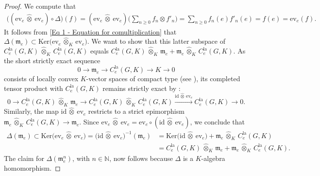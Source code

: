 \documentclass[a4paper, reqno, 10pt]{amsart}
\theoremstyle{definition}
\numberwithin{equation}{section}
\newcommand{\cotimes}[1]{{\,\widehat{\otimes}_{#1}\,}}
\newcommand{\ev}{{\mathrm{ev}}}
\newcommand{\id}{{\mathrm{id}}}
\newcommand{\Ker}{{\mathrm{Ker}}}
\newcommand{\la}{{\mathrm{la}}}
\newcommand{\lra}{\longrightarrow}
\newcommand{\lto}{\longmapsto}
\newcommand{\projotimes}{{\,\otimes_{K,\pi}\,}}
\newcommand{\projcotimes}{{\,\widehat{\otimes}_{K,\pi}\,}}
\newcommand{\ra}{\rightarrow}
\newcommand{\BN}{{\mathbb {N}}}
\newcommand{\Fm}{{\mathfrak {m}}}
\begin{document}
\begin{proof}
	We compute that
	\begin{align*}
		\big((\mathrm{ev}_e \cotimes{} \mathrm{ev}_e)\circ \Delta\big)(f) = (\mathrm{ev}_e \cotimes{} \mathrm{ev}_e)\bigg(\sum_{n\geq 0} f_n \otimes f'_n\bigg) = \sum_{n\geq 0} f_n(e) f'_n(e) = f(e) = \ev_e(f).
	\end{align*}
	It follows from \eqref{Eq 1 - Equation for comultiplication} that $\Delta(\Fm_e) \subset \Ker \big(\mathrm{ev}_e \cotimes{K} \mathrm{ev}_e \big)$.
	We want to show that this latter subspace of $C^\la_e(G,K) \cotimes{K} C^\la_e(G,K)$ equals $C^\la_e(G,K) \cotimes{K} \Fm_e + \Fm_e \cotimes{K} C^\la_e(G,K)$.
	As the short strictly exact sequence
	\begin{equation*}
		0 \lra  \Fm_e  \lra  C^\la_e(G,K) \lra K  \lra 0
	\end{equation*}	
	consists of locally convex $K$-vector spaces of compact type (see ), its completed tensor product with $C^\la_e(G,K)$ remains strictly exact by \cite[Cor.\ 2.2]{BreuilHerzig18TowardsFinSlopePartGLn}:
	\begin{equation*}
		0 \lra C^\la_e(G,K) \cotimes{K} \Fm_e  \lra  C^\la_e(G,K) \cotimes{K} C^\la_e(G,K) \xrightarrow{\id \cotimes{} \ev_e} C^\la_e(G,K)  \lra 0 .
	\end{equation*}
	Similarly, the map $\id \cotimes{} \ev_e $ restricts to a strict epimorphism $ \Fm_e \cotimes{K} C^\la_e(G,K) \ra \Fm_e$.
	Since $\mathrm{ev}_e \cotimes{} \mathrm{ev}_e = \mathrm{ev}_e \circ (\id \cotimes{} \ev_e)$, we conclude that
	\begin{align*}
		\Delta(\Fm_e) \subset \Ker\big(\mathrm{ev}_e \cotimes{} \mathrm{ev}_e \big) = \big(\id \cotimes{} \ev_e \big)^{-1} (\Fm_e) 
		&= \Ker \big( \id \cotimes{} \ev_e \big) + \Fm_e \cotimes{K} C^\la_e(G,K) \\
		&= C^\la_e(G,K) \cotimes{K} \Fm_e + \Fm_e \cotimes{K} C^\la_e(G,K) .
	\end{align*}
	The claim for $\Delta(\Fm_e^n)$, with $n\in \BN$, now follows because $\Delta$ is a $K$-algebra homomorphism.
	
\end{proof}
\end{document}
